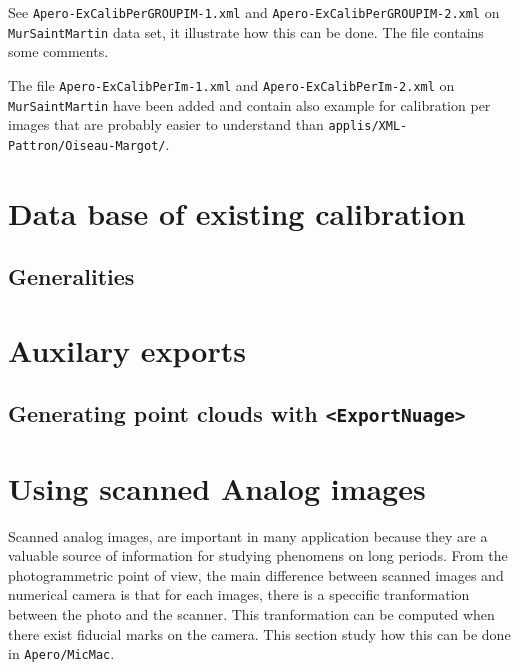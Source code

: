 See {\tt Apero-ExCalibPerGROUPIM-1.xml} and
{\tt Apero-ExCalibPerGROUPIM-2.xml}  on  {\tt MurSaintMartin} data
set, it illustrate how this can be done. The file contains
some comments.


The file {\tt Apero-ExCalibPerIm-1.xml} and {\tt Apero-ExCalibPerIm-2.xml}
on  {\tt MurSaintMartin} have been added and contain also
example for calibration per images that are probably easier to understand
than {\tt  applis/XML-Pattron/Oiseau-Margot/}.


\section{Data base of existing calibration}

\label{DB:Calib}
\subsection{Generalities}


\section{Auxilary exports}


\subsection{Generating point clouds with {\tt <ExportNuage>}}

\label{Ap:Exp:Nuage}



\section{Using scanned Analog images}

\label{Analog:Image}
Scanned analog images, are important in many application because  they are
a valuable source of information for studying phenomens on long periods.
From the photogrammetric point of view, the main difference between
scanned images and numerical camera is that for each images, there
is a speccific  tranformation between the photo and the scanner.
This tranformation can be computed when there exist fiducial marks
on the camera. This section study how this can be done in {\tt Apero/MicMac}.


